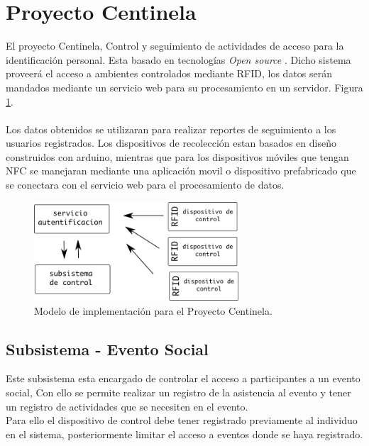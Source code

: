 \documentclass[11pt,twocolumn]{article}
\begin{document}
\section{Proyecto Centinela}

El proyecto Centinela, Control y seguimiento de actividades de acceso para la identificaci\'on personal. Esta basado en tecnolog\'ias  
\textit{ Open source }. Dicho sistema  proveer\'a el acceso a ambientes controlados mediante RFID, los datos ser\'an mandados mediante un servicio web para su procesamiento en un servidor.  Figura \ref{fig-centinela}.\\
\\
Los datos obtenidos se utilizaran para realizar reportes de seguimiento a los usuarios registrados. Los dispositivos de recolecci\'on estan basados en dise\~no construidos con arduino, mientras  que para los dispositivos m\'oviles que tengan NFC se manejaran mediante una aplicaci\'on movil o dispositivo prefabricado que se conectara con el servicio web para el procesamiento de datos.\\

\begin{figure}[!h]
  \begin{center}
    \includegraphics[width=3in]{diagram.png}
  \end{center}

  \caption{\small Modelo de implementaci\'on para el Proyecto Centinela.}
  \label{fig-centinela}
\end{figure}

\subsection{Subsistema -  Evento Social}

Este subsistema esta encargado de controlar el acceso a participantes a un 
evento social, Con ello se permite realizar un registro de la asistencia 
al evento y tener un registro de actividades que se necesiten en el evento.
\\

Para ello el dispositivo de control debe tener registrado previamente al 
individuo en el sistema, posteriormente limitar el acceso a eventos donde 
se haya registrado.\\
\end{document}
